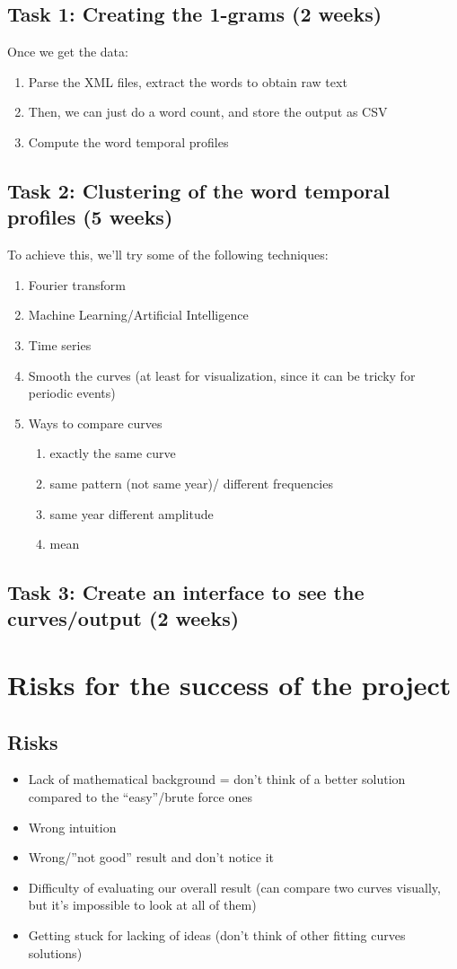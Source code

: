 \documentclass{article}
\begin{document}
\subsection{Task 1: Creating the 1-grams (2 weeks)}
 Once we get the data: 
\begin{enumerate}
  \item Parse the XML files, extract the words to obtain raw text
  \item Then, we can just do a word count, and store the output as CSV
  \item Compute the word temporal profiles 
\end{enumerate}
\subsection{Task 2: Clustering of the word temporal profiles (5 weeks)}
To achieve this, we'll try some of the following techniques:
\begin{enumerate}
\item Fourier transform
\item Machine Learning/Artificial Intelligence
\item Time series
\item Smooth the curves (at least for visualization, since it can be tricky for periodic events)
\item Ways to compare curves
\begin{enumerate}
\item exactly the same curve
\item same pattern (not same year)/ different frequencies
\item same year different amplitude
\item mean
\end{enumerate}
\end{enumerate}
\subsection{Task 3: Create an interface to see the curves/output (2 weeks)}
\section{Risks for the success of the project}
\subsection{Risks}
\begin{itemize}
\item Lack of mathematical background = don’t think of a better solution compared to the “easy”/brute force ones
\item Wrong intuition 
\item Wrong/”not good” result and don’t notice it
\item Difficulty of evaluating our overall result (can compare two curves visually, but it's impossible to look at all of them)
\item Getting stuck for lacking of ideas (don’t think of other fitting curves solutions)

\end{itemize}
\end{document}
